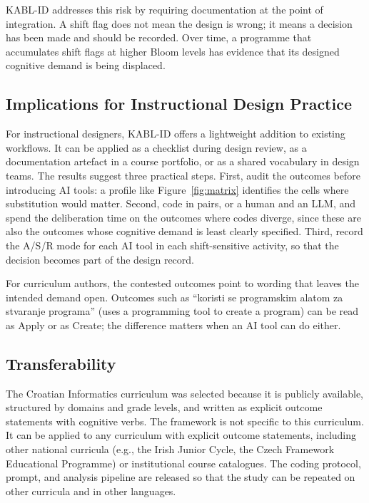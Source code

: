 \documentclass[journal,article,submit,pdftex,moreauthors]{Definitions/mdpi}
\begin{document}
KABL-ID addresses this risk by requiring documentation at the point of integration. A shift flag does not mean the design is wrong; it means a decision has been made and should be recorded. Over time, a programme that accumulates shift flags at higher Bloom levels has evidence that its designed cognitive demand is being displaced.

\subsection{Implications for Instructional Design Practice}

For instructional designers, KABL-ID offers a lightweight addition to existing workflows. It can be applied as a checklist during design review, as a documentation artefact in a course portfolio, or as a shared vocabulary in design teams. The results suggest three practical steps. First, audit the outcomes before introducing AI tools: a profile like Figure~\ref{fig:matrix} identifies the cells where substitution would matter. Second, code in pairs, or a human and an LLM, and spend the deliberation time on the outcomes where codes diverge, since these are also the outcomes whose cognitive demand is least clearly specified. Third, record the A/S/R mode for each AI tool in each shift-sensitive activity, so that the decision becomes part of the design record.

For curriculum authors, the contested outcomes point to wording that leaves the intended demand open. Outcomes such as ``koristi se programskim alatom za stvaranje programa'' (uses a programming tool to create a program) can be read as Apply or as Create; the difference matters when an AI tool can do either.

\subsection{Transferability}

The Croatian Informatics curriculum was selected because it is publicly available, structured by domains and grade levels, and written as explicit outcome statements with cognitive verbs. The framework is not specific to this curriculum. It can be applied to any curriculum with explicit outcome statements, including other national curricula (e.g., the Irish Junior Cycle, the Czech Framework Educational Programme) or institutional course catalogues. The coding protocol, prompt, and analysis pipeline are released so that the study can be repeated on other curricula and in other languages.
\end{document}
